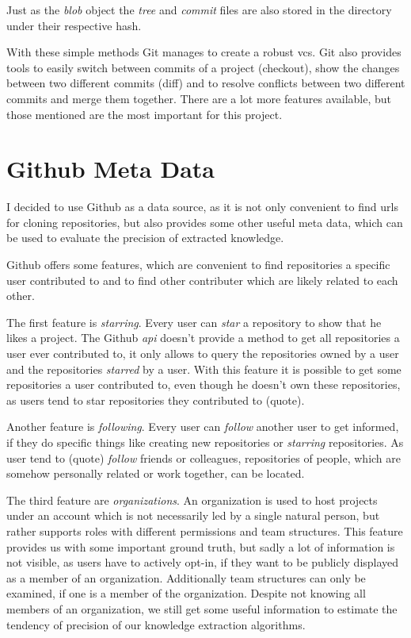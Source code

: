 Just as the \emph{blob} object the \emph{tree} and \emph{commit} files are also stored in the  directory under their respective hash.

With these simple methods Git manages to create a robust \ac{vcs}.
Git also provides tools to easily switch between commits of a project (checkout), show the changes between two different commits (diff) and to resolve conflicts between two different commits and merge them together.
There are a lot more features available, but those mentioned are the most important for this project.

\section{Github Meta Data}\label{github-meta-data}

I decided to use Github as a data source, as it is not only convenient to find \acp{url} for cloning repositories, but also provides some other useful meta data, which can be used to evaluate the precision of extracted knowledge.

Github offers some features, which are convenient to find repositories a specific user contributed to and to find other contributer which are likely related to each other.

The first feature is \emph{starring}. Every user can \emph{star} a repository to show that he likes a project.
The Github \emph{api} doesn't provide a method to get all repositories a user ever contributed to, it only allows to query the repositories owned by a user and the repositories \emph{starred} by a user.
With this feature it is possible to get some repositories a user contributed to, even though he doesn't own these repositories, as users tend to star repositories they contributed to (quote).

Another feature is \emph{following}. Every user can \emph{follow} another user to get informed, if they do specific things like creating new repositories or \emph{starring} repositories.
As user tend to (quote) \emph{follow} friends or colleagues, repositories of people, which are somehow personally related or work together, can be located.

The third feature are \emph{organizations}.
An organization is used to host projects under an account which is not necessarily led by a single natural person, but rather supports roles with different permissions and team structures.
This feature provides us with some important ground truth, but sadly a lot of information is not visible, as users have to actively opt-in, if they want to be publicly displayed as a member of an organization.
Additionally team structures can only be examined, if one is a member of the organization.
Despite not knowing all members of an organization, we still get some useful information to estimate the tendency of precision of our knowledge extraction algorithms.


